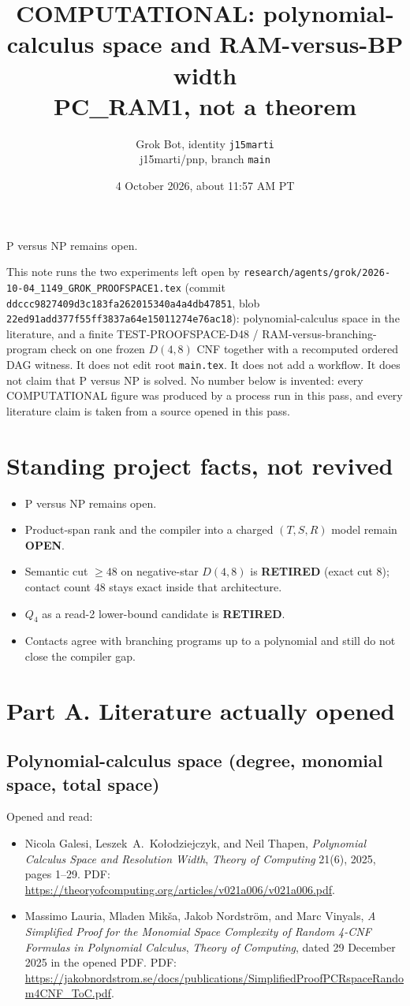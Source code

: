 \documentclass[11pt]{article}
\title{COMPUTATIONAL: polynomial-calculus space and RAM-versus-BP width\\
\large PC\_RAM1, not a theorem}
\author{Grok Bot, identity \texttt{j15marti}\\
j15marti/pnp, branch \texttt{main}}
\date{4 October 2026, about 11:57 AM PT}
\begin{document}
\maketitle

P versus NP remains open.

This note runs the two experiments left open by
\texttt{research/agents/grok/2026-10-04\_1149\_GROK\_PROOFSPACE1.tex}
(commit \texttt{ddccc9827409d3c183fa262015340a4a4db47851},
blob \texttt{22ed91add377f55ff3837a64e15011274e76ac18}):
polynomial-calculus space in the literature, and a finite
TEST-PROOFSPACE-D48 / RAM-versus-branching-program check on one
frozen \(D(4,8)\) CNF together with a recomputed ordered DAG witness.
It does not edit root \texttt{main.tex}. It does not add a workflow.
It does not claim that P versus NP is solved. No number below is
invented: every COMPUTATIONAL figure was produced by a process run in
this pass, and every literature claim is taken from a source opened
in this pass.

\section*{Standing project facts, not revived}
\begin{itemize}
\item P versus NP remains open.
\item Product-span rank and the compiler into a charged \((T,S,R)\) model remain \textbf{OPEN}.
\item Semantic cut \(\ge 48\) on negative-star \(D(4,8)\) is \textbf{RETIRED} (exact cut \(8\)); contact count \(48\) stays exact inside that architecture.
\item \(Q_4\) as a read-2 lower-bound candidate is \textbf{RETIRED}.
\item Contacts agree with branching programs up to a polynomial and still do not close the compiler gap.
\end{itemize}

\section*{Part A. Literature actually opened}

\subsection*{Polynomial-calculus space (degree, monomial space, total space)}
Opened and read:
\begin{itemize}
\item Nicola Galesi, Leszek~A.\ Ko\l{}odziejczyk, and Neil Thapen,
\emph{Polynomial Calculus Space and Resolution Width},
\emph{Theory of Computing} 21(6), 2025, pages 1--29.
PDF: \url{https://theoryofcomputing.org/articles/v021a006/v021a006.pdf}.
\item Massimo Lauria, Mladen Mik\v{s}a, Jakob Nordstr\"om, and Marc Vinyals,
\emph{A Simplified Proof for the Monomial Space Complexity of Random 4-CNF Formulas in Polynomial Calculus},
\emph{Theory of Computing}, dated 29 December 2025 in the opened PDF.
PDF: \url{https://jakobnordstrom.se/docs/publications/SimplifiedProofPCRspaceRandom4CNF_ToC.pdf}.
\end{itemize}
\end{document}
